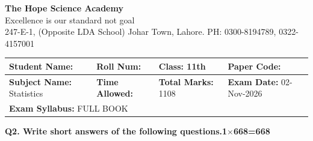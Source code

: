 \documentclass[11pt,a4paper]{article}
\begin{document}
\begin{center}
  {\Huge\bfseries The Hope Science Academy}\\[3pt]
  {\small Excellence is our standard not goal}\\[2pt]
  {\small 247-E-1, (Opposite LDA School) Johar Town, Lahore. PH: 0300-8194789, 0322-4157001}
\end{center}
\medskip\noindent
\begin{tabularx}{\linewidth}{|X|X|X|X|}
\hline
\textbf{Student Name:} & \textbf{Roll Num:} & \textbf{Class:} 11th & \textbf{Paper Code:} \\ \hline
\textbf{Subject Name:} Statistics & \textbf{Time Allowed:} & \textbf{Total Marks:} 1108 & \textbf{Exam Date:} 02-Nov-2026 \\ \hline
\multicolumn{4}{|l|}{\textbf{Exam Syllabus:} FULL BOOK} \\ \hline
\end{tabularx}
\bigskip
\noindent\textbf{Q2. Write short answers of the following questions.}\hfill\textbf{1$\times$668=668}
\end{document}
